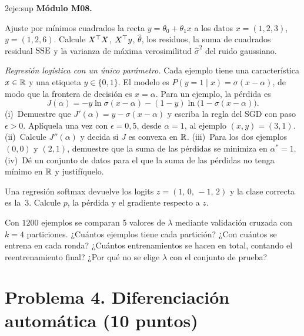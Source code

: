 \begin{ejercicio}{2}{eje:sup}
\textbf{Módulo M08.}
\begin{apartados}
  \item {} Ajuste por mínimos cuadrados la recta $y=\theta_0+\theta_1x$ a los datos $x=(1,2,3)$, $y=(1,2,6)$. Calcule $X^{\top} X$, $X^{\top} y$, $\hat\theta$, los residuos, la suma de cuadrados residual $\operatorname{SSE}$ y la varianza de máxima verosimilitud $\hat\sigma^{2}$ del ruido gaussiano.
  \item {} \emph{Regresión logística con un único parámetro.} Cada ejemplo tiene una característica $x\in\mathbb{R}$ y una etiqueta $y\in\{0,1\}$. El modelo es $P(y=1\mid x)=\sigma(x-\alpha)$, de modo que la frontera de decisión es $x=\alpha$. Para un ejemplo, la pérdida es
  \[
  J(\alpha)=-y\ln\sigma(x-\alpha)-(1-y)\ln\bigl(1-\sigma(x-\alpha)\bigr).
  \]
  (i)~Demuestre que $J'(\alpha)=y-\sigma(x-\alpha)$ y escriba la regla del SGD con paso $\epsilon>0$. Aplíquela una vez con $\epsilon=0{,}5$, desde $\alpha=1$, al ejemplo $(x,y)=(3,1)$.
  (ii)~Calcule $J''(\alpha)$ y decida si $J$ es convexa en $\mathbb{R}$.
  (iii)~Para los dos ejemplos $(0,0)$ y $(2,1)$, demuestre que la suma de las pérdidas se minimiza en $\alpha^{*}=1$.
  (iv)~Dé un conjunto de datos para el que la suma de las pérdidas no tenga mínimo en $\mathbb{R}$ y justifíquelo.
  \item {} Una regresión softmax devuelve los logits $z=(1,\,0,\,-1,\,2)$ y la clase correcta es la~3. Calcule $p$, la pérdida y el gradiente respecto a $z$.
  \item {} Con $1200$ ejemplos se comparan 5 valores de $\lambda$ mediante validación cruzada con $k=4$ particiones. ¿Cuántos ejemplos tiene cada partición? ¿Con cuántos se entrena en cada ronda? ¿Cuántos entrenamientos se hacen en total, contando el reentrenamiento final? ¿Por qué no se elige $\lambda$ con el conjunto de prueba?
\end{apartados}
\end{ejercicio}

\section*{Problema 4. Diferenciación automática (10 puntos)}

